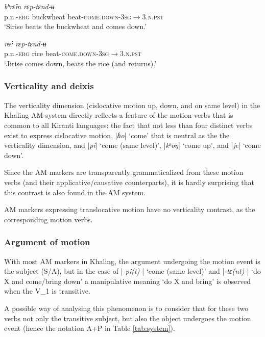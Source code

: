 \documentclass[oneside,a4paper,11pt]{article}
\newcommand{\ipa}[1]{{\phon\textit{#1}}}
\newcommand{\dhatu}[2]{|\ipa{#1}| `#2'}
\begin{document}
 \begin{exe}
\ex \label{ex:ryaptyandyu1}
  \gll   \ipa{siriseʔ-ɛ} \ipa{bʰrɛ̂m}  \ipa{rɛp-tɛnd-ʉ} \\
   p.n.-\textsc{erg} buckwheat beat-\textsc{come.down}-\textsc{3sg$\rightarrow$3.n.pst} \\
\glt `Sirise beats the buckwheat and comes down.'
 \end{exe}
 
 
 \begin{exe}
\ex \label{ex:ryaptyandyu2}
 \gll   \ipa{dzirise-ʔɛ} \ipa{rɵ̂:} \ipa{rɛp-tɛnd-ʉ} \\
 p.n.-\textsc{erg} rice beat-\textsc{come.down}-\textsc{3sg$\rightarrow$3.n.pst} \\
\glt `Jirise comes down, beats the rice (and returns).'
 \end{exe}


 \subsubsection{Verticality and deixis} \label{sec:verticality.khaling}
 The verticality dimension (cislocative motion up, down, and on same level) in the Khaling AM system directly reflects a feature of the motion verbs that is common to all Kiranti languages: the fact that not less than four distinct verbs exist to express cislocative motion, \dhatu{ɦo}{come} that is neutral as the the verticality dimension, and \dhatu{pi}{come (same level)}, \dhatu{kʰoŋ}{come up}, and \dhatu{je}{come down}. 
 
 Since the AM markers are transparently grammaticalized from these motion verbs (and their applicative/causative counterparts), it is hardly surprising that this contrast is also found in the AM system.
 
 AM markers expressing translocative motion have no verticality contrast, as the corresponding motion verbs.
 
  \subsubsection{Argument of motion} \label{sec:argument.khaling}
With most AM markers in Khaling, the argument undergoing the motion event is the subject (S/A), but in the case of  \dhatu{-pi(t)-}{come (same level)} and   \dhatu{-tɛ(nt)-}{do X and come/bring down} a manipulative meaning `do X and bring' is observed when the V_1 is transitive. 

A possible way of analysing this phenomenon is to consider that for these two verbs not only the transitive subject, but also the object undergoes the motion event (hence the notation A+P in Table \ref{tab:system}).
\end{document}
